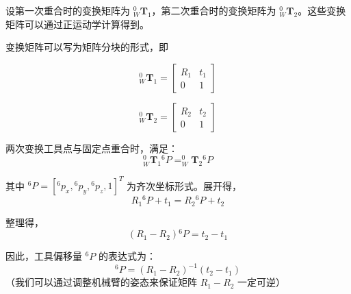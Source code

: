 \documentclass{homework}
\begin{document}
\begin{sol}

设第一次重合时的变换矩阵为 $ _W^0\mathbf{T}_1 $，第二次重合时的变换矩阵为 $ _W^0\mathbf{T}_2 $。这些变换矩阵可以通过正运动学计算得到。

变换矩阵可以写为矩阵分块的形式，即

\[
  _W^0\mathbf{T}_1 = 
  \begin{bmatrix}
    R_1 & t_1 \\
    0 & 1
  \end{bmatrix}
\]

\[
  _W^0\mathbf{T}_2 = 
  \begin{bmatrix}
    R_2 & t_2 \\
    0 & 1
  \end{bmatrix}
\]

两次变换工具点与固定点重合时，满足：
\[
  _W^0\mathbf{T}_1 {^6}P = _W^0\mathbf{T}_2 {^6}P
\]

其中 $ {^6}P = [{^6}p_x, {^6}p_y, {^6}p_z, 1]^T $ 为齐次坐标形式。展开得，
\[
  R_1 {^6}P + t_1 = R_2 {^6}P + t_2
\]

整理得，
\[
  (R_1 - R_2) {^6}P = t_2 - t_1
\]

因此，工具偏移量 $ {^6}P $ 的表达式为：
\[
 {^6}P = (R_1 - R_2)^{-1} (t_2 - t_1)
\]
（我们可以通过调整机械臂的姿态来保证矩阵 $ R_1 - R_2 $ 一定可逆）
  
\end{sol}

\question 
\end{document}
